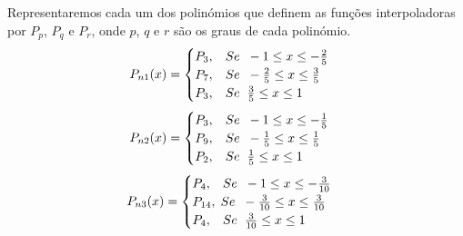 \documentclass[12pt]{article}
\begin{document}
Representaremos cada um dos polinómios que definem as funções interpoladoras por $P_p$, $P_q$ e $P_r$, onde $p$, $q$ e $r$ são os graus de cada polinómio.
\begin{equation*}
     P_{n1}(x)=
    \begin{cases}
   
        P_3,\hspace{0.3cm}Se\hspace{0.2cm} -1\leq x \leq -\frac{2}{5}\\
        P_7,\hspace{0.3cm}Se\hspace{0.2cm} -\frac{2}{5}\leq x \leq \frac{3}{5}\\
        P_3,\hspace{0.3cm}Se\hspace{0.2cm} \frac{3}{5}\leq x \leq 1
   
    \end{cases}
\end{equation*}
\begin{equation*}
     P_{n2}(x)=
    \begin{cases}{}
        P_3,\hspace{0.3cm}Se\hspace{0.2cm} -1\leq x \leq -\frac{1}{5}\\
        P_9,\hspace{0.3cm}Se\hspace{0.2cm} -\frac{1}{5}\leq x \leq \frac{1}{5}\\
        P_2,\hspace{0.3cm}Se\hspace{0.2cm} \frac{1}{5}\leq x \leq 1
    \end{cases}
\end{equation*}
\begin{equation*}
     P_{n3}(x)=
    \begin{cases}
   
        P_4,\hspace{0.3cm}Se\hspace{0.2cm} -1\leq x \leq -\frac{3}{10}\\
        P_{14},\hspace{0.1cm}Se\hspace{0.2cm} -\frac{3}{10}\leq x \leq \frac{3}{10}\\
        P_4,\hspace{0.3cm}Se\hspace{0.2cm} \frac{3}{10}\leq x \leq 1
   
    \end{cases}
\end{equation*}
\end{document}
